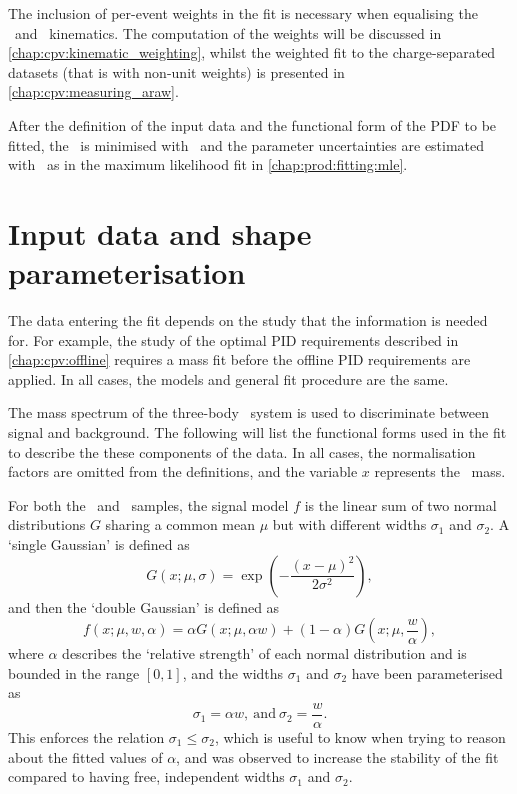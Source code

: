 The inclusion of per-event weights in the fit is necessary when equalising the 
\pKK\ and \ppipi\ kinematics.
The computation of the weights will be discussed in 
\cref{chap:cpv:kinematic_weighting}, whilst the weighted fit to the 
charge-separated datasets (that is with non-unit weights) is presented in 
\cref{chap:cpv:measuring_araw}.

After the definition of the input data and the functional form of the \ac{PDF} 
to be fitted, the \chisq\ is minimised with \minuit\ and the parameter 
uncertainties are estimated with \hesse\ as in the maximum likelihood fit in 
\cref{chap:prod:fitting:mle}.

\section{Input data and shape parameterisation}
\label{chap:cpv:prelim_fits:data_pdfs}

The data entering the fit depends on the study that the information is needed 
for.
For example, the study of the optimal \ac{PID} requirements described in 
\cref{chap:cpv:offline} requires a mass fit before the offline \ac{PID} 
requirements are applied.
In all cases, the models and general fit procedure are the same.

The mass spectrum of the three-body \phh\ system is used to discriminate 
between signal and background.
The following will list the functional forms used in the fit to describe the 
these components of the data.
In all cases, the normalisation factors are omitted from the definitions, and 
the variable $x$ represents the \PLambdac\ mass.

For both the \pKK\ and \ppipi\ samples, the signal model $f$ is the linear sum 
of two normal distributions $G$ sharing a common mean $\mu$ but with different 
widths $\sigma_{1}$ and $\sigma_{2}$.
A `single Gaussian' is defined as
\begin{equation}
  G(x; \mu, \sigma) = \exp\left(-\frac{{(x - \mu)}^{2}}{2\sigma^{2}}\right),
\end{equation}
and then the `double Gaussian' is defined as
\begin{equation}
  f(x; \mu, w, \alpha) = \alpha{}G(x; \mu, \alpha{w}) +
    (1 - \alpha)G(x; \mu, \frac{w}{\alpha}),
  \label{eqn:cpv:prelim_fits:sig_model}
\end{equation}
where $\alpha$ describes the `relative strength' of each normal distribution 
and is bounded in the range $[0, 1]$, and the widths $\sigma_{1}$ and 
$\sigma_{2}$ have been parameterised as
\begin{equation}
  \sigma_{1} = \alpha{w},\ \text{and}\ \sigma_{2} = \frac{w}{\alpha}.
  \label{eqn:cpv:prelim_fits:sigma_def}
\end{equation}
This enforces the relation $\sigma_{1} \leq \sigma_{2}$, which is useful to 
know when trying to reason about the fitted values of $\alpha$, and was 
observed to increase the stability of the fit compared to having free, 
independent widths $\sigma_{1}$ and $\sigma_{2}$.


